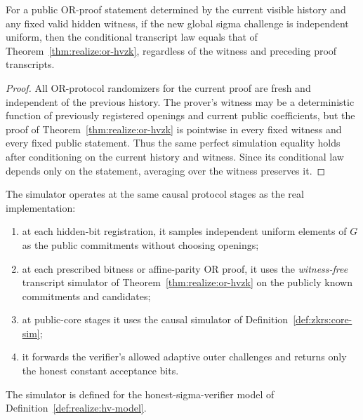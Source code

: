 \begin{lemma}\label{lem:realize:conditional-or}
For a public OR-proof statement determined by
the current visible history and any fixed
valid hidden witness, if the new global sigma
challenge is independent uniform, then the
conditional transcript law equals that of
Theorem~\ref{thm:realize:or-hvzk},
regardless of the witness and preceding
proof transcripts.
\end{lemma}
\begin{proof}
All OR-protocol randomizers for the current
proof are fresh and independent of the
previous history. The prover's witness
may be a deterministic function of
previously registered openings and current
public coefficients, but the proof
of Theorem~\ref{thm:realize:or-hvzk}
is pointwise in every fixed witness and
every fixed public statement.
Thus the same perfect simulation equality
holds after conditioning on the current
history and witness. Since its conditional
law depends only on the statement,
averaging over the witness preserves it.
\end{proof}

\begin{definition}\label{def:realize:hv-sim}
The simulator operates at the same causal protocol
stages as the real implementation:
\begin{enumerate}[label=\textup{(\roman*)}]
\item at each hidden-bit registration, it samples
independent uniform elements of $G$ as the
public commitments without choosing openings;
\item at each prescribed bitness or affine-parity
OR proof, it uses the \emph{witness-free}
transcript simulator of
Theorem~\ref{thm:realize:or-hvzk}
on the publicly known commitments and candidates;
\item at public-core stages it uses the
causal simulator of
Definition~\ref{def:zkrs:core-sim};
\item it forwards the verifier's allowed
adaptive outer challenges and returns only
the honest constant acceptance bits.
\end{enumerate}
The simulator is defined for the honest-sigma-verifier
model of Definition~\ref{def:realize:hv-model}.
\end{definition}

